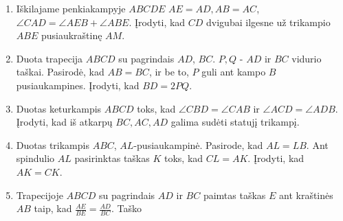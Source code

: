 \begin{enumerate}
\item Iškilajame penkiakampyje $ABCDE$ $AE = AD,AB = AC$, $\angle CAD =
  \angle AEB + \angle ABE$. Įrodyti, kad $CD$ dvigubai ilgesne už
  trikampio $ABE$ pusiaukraštinę $AM$.
\item Duota trapecija $ABCD$ su pagrindais $AD$, $BC$.  $P,Q$ - $AD$ ir
  $BC$ vidurio taškai. Pasirodė, kad $AB = BC$, ir be to, $P$ guli ant
  kampo $B$ pusiaukampines.  Įrodyti, kad $BD = 2PQ$.
\item Duotas keturkampis $ABCD$ toks, kad $\angle CBD = \angle CAB$ ir
  $\angle ACD = \angle ADB$. Įrodyti, kad iš atkarpų $BC, AC, AD$ galima
  sudėti statujį trikampį.
\item Duotas trikampis $ABC$, $AL$-pusiaukampinė. Pasirode, kad $AL = LB$.
  Ant spindulio $AL$ pasirinktas taškas $K$ toks, kad $CL = AK$. Įrodyti,
  kad $AK = CK$.
\item Trapecijoje $ABCD$ su pagrindais $AD$ ir $BC$ paimtas taškas $E$ ant
  kraštinės $AB$ taip, kad $\frac{AE}{BE} = \frac{AD}{BC}$. Taško

\end{enumerate}
